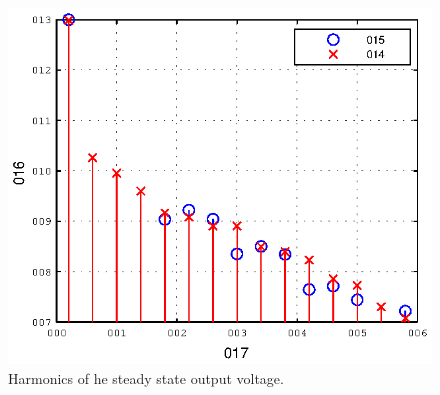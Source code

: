 \documentclass[conference,10pt]{IEEEtran}
\begin{document}
\begin{figure}[!h]
\centering

\includegraphics{fig/steady_state_harmonics}
\caption{Harmonics of he steady state output voltage.}
\label{fig:ss_harm}
\end{figure}






\end{document}
